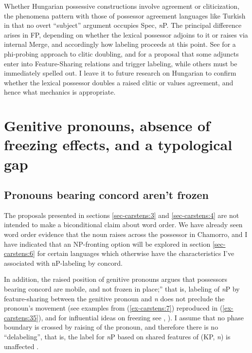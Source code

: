 \documentclass[output=paper
,modfonts
,nonflat]{langsci/langscibook}
\begin{document}
Whether Hungarian possessive constructions involve agreement or cliticization, the phenomena pattern with those of possessor agreement languages like Turkish in that no overt “subject” argument occupies Spec, \textit{n}P. The principal difference arises in FP, depending on whether the lexical possessor adjoins to it or raises via internal Merge, and accordingly how labeling proceeds at this point. See \citet{Preminger2014} for a phi-probing approach to clitic doubling, and \citet{Oseki2014} for a proposal that some adjuncts enter into Feature-Sharing relations and trigger labeling, while others must be immediately spelled out. I leave it to future research on Hungarian to confirm whether the lexical possessor doubles a raised clitic or values agreement, and hence what mechanics is appropriate.

\section{Genitive pronouns, absence of freezing effects, and a typological gap} \label{sec-carstens:5}

\subsection{Pronouns bearing concord aren't frozen}\label{sec-carstens:5.1}
The proposals presented in sections \ref{sec-carstens:3} and \ref{sec-carstens:4} are not intended to make a biconditional claim about word order. We have already seen word order evidence that the noun raises across the possessor in Chamorro, and I have indicated that an NP-fronting option will be explored in section \ref{sec-carstens:6} for certain languages which otherwise have the characteristics I’ve associated with nP-labeling by concord. 

In addition, the raised position of genitive pronouns argues that possessors bearing concord are mobile, and not {\textquotedbl}frozen in place;” that is, labeling of \textit{n}P by feature-sharing between the genitive pronoun and \textit{n} does not preclude the pronoun’s movement (see examples from (\ref{ex-carstens:7}) reproduced in (\ref{ex-carstens:35}), and for influential ideas on freezing see \citealt{Rizzi2006}, \citealt{Rizzi_Shlonsky2007}). I assume that no phase boundary is crossed by raising of the pronoun, and therefore there is no “delabeling”, that is, the label for \textit{n}P based on shared features of (KP, \textit{n}) is unaffected \citep[11]{Chomsky2015}.
\end{document}
